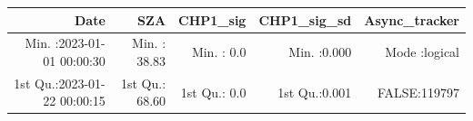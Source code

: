 \documentclass[
  10pt,
  a4paper,oneside]{article}
\begin{document}
\begin{longtable}[]{@{}rrrrr@{}}
\toprule
\begin{minipage}[b]{0.26\columnwidth}\raggedleft
Date\strut
\end{minipage} & \begin{minipage}[b]{0.15\columnwidth}\raggedleft
SZA\strut
\end{minipage} & \begin{minipage}[b]{0.17\columnwidth}\raggedleft
CHP1\_sig\strut
\end{minipage} & \begin{minipage}[b]{0.14\columnwidth}\raggedleft
CHP1\_sig\_sd\strut
\end{minipage} & \begin{minipage}[b]{0.14\columnwidth}\raggedleft
Async\_tracker\strut
\end{minipage}\tabularnewline
\midrule
\endhead
\begin{minipage}[t]{0.26\columnwidth}\raggedleft
Min. :2023-01-01 00:00:30\strut
\end{minipage} & \begin{minipage}[t]{0.15\columnwidth}\raggedleft
Min. : 38.83\strut
\end{minipage} & \begin{minipage}[t]{0.17\columnwidth}\raggedleft
Min. : 0.0\strut
\end{minipage} & \begin{minipage}[t]{0.14\columnwidth}\raggedleft
Min. :0.000\strut
\end{minipage} & \begin{minipage}[t]{0.14\columnwidth}\raggedleft
Mode :logical\strut
\end{minipage}\tabularnewline
\begin{minipage}[t]{0.26\columnwidth}\raggedleft
1st Qu.:2023-01-22 00:00:15\strut
\end{minipage} & \begin{minipage}[t]{0.15\columnwidth}\raggedleft
1st Qu.: 68.60\strut
\end{minipage} & \begin{minipage}[t]{0.17\columnwidth}\raggedleft
1st Qu.: 0.0\strut
\end{minipage} & \begin{minipage}[t]{0.14\columnwidth}\raggedleft
1st Qu.:0.001\strut
\end{minipage} & \begin{minipage}[t]{0.14\columnwidth}\raggedleft
FALSE:119797\strut
\end{minipage}\tabularnewline

\end{longtable}
\end{document}
